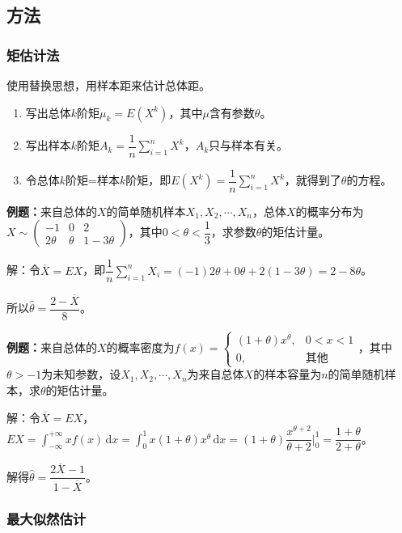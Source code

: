 \documentclass[UTF8, 12pt]{ctexart}
\begin{document}
\subsection{方法}

\subsubsection{矩估计法}

使用替换思想，用样本距来估计总体距。

\begin{enumerate}
    \item 写出总体$k$阶矩$\mu_k=E(X^k)$，其中$\mu$含有参数$\theta$。
    \item 写出样本$k$阶矩$A_k=\dfrac{1}{n}\sum\limits_{i=1}^nX^k$，$A_k$只与样本有关。
    \item 令总体$k$阶矩=样本$k$阶矩，即$E(X^k)=\dfrac{1}{n}\sum\limits_{i=1}^nX^k$，就得到了$\theta$的方程。
\end{enumerate}

\textbf{例题：}来自总体的$X$的简单随机样本$X_1,X_2,\cdots,X_n$，总体$X$的概率分布为$X\sim\left(\begin{array}{ccc}
    -1 & 0 & 2 \\
    2\theta & \theta & 1-3\theta
\end{array}\right)$，其中$0<\theta<\dfrac{1}{3}$，求参数$\theta$的矩估计量。

解：令$\overline{X}=EX$，即$\dfrac{1}{n}\sum\limits_{i=1}^nX_i=(-1)2\theta+0\theta+2(1-3\theta)=2-8\theta$。

所以$\hat{\theta}=\dfrac{2-\overline{X}}{8}$。

\textbf{例题：}来自总体的$X$的概率密度为$f(x)=\left\{\begin{array}{ll}
    (1+\theta)x^\theta, & 0<x<1 \\
    0, & \text{其他}
\end{array}\right.$，其中$\theta>-1$为未知参数，设$X_1,X_2,\cdots,X_n$为来自总体$X$的样本容量为$n$的简单随机样本，求$\theta$的矩估计量。

解：令$\overline{X}=EX$，$EX=\int_{-\infty}^{+\infty}xf(x)\,\textrm{d}x=\int_0^1x(1+\theta)x^\theta\,\textrm{d}x=(1+\theta)\dfrac{x^{\theta+2}}{\theta+2}\bigg|_0^1=\dfrac{1+\theta}{2+\theta}$。

解得$\hat{\theta}=\dfrac{2\overline{X}-1}{1-\overline{X}}$。

\subsubsection{最大似然估计}
\end{document}
